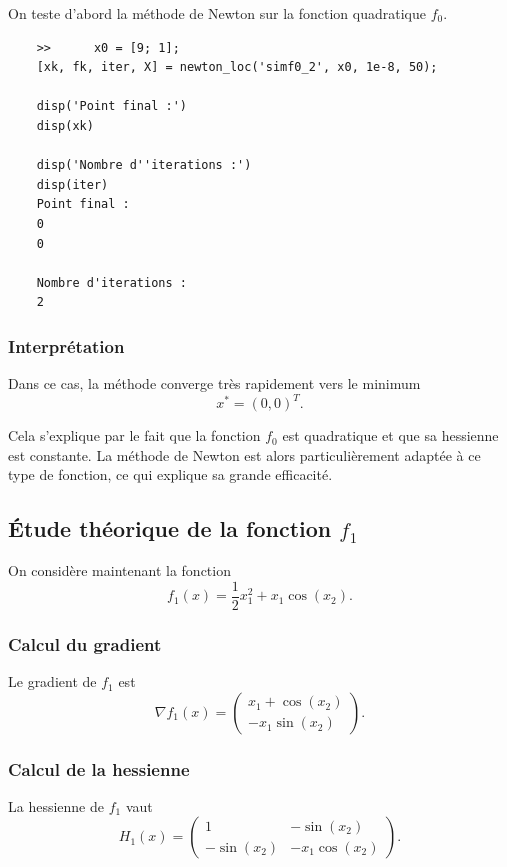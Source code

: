\documentclass[a4paper,12pt]{article}
\begin{document}
	On teste d’abord la méthode de Newton sur la fonction quadratique \(f_0\).
	
	\begin{verbatim}
	>> 		x0 = [9; 1];
	[xk, fk, iter, X] = newton_loc('simf0_2', x0, 1e-8, 50);
	
	disp('Point final :')
	disp(xk)
	
	disp('Nombre d''iterations :')
	disp(iter)
	Point final :
	0
	0
	
	Nombre d'iterations :
	2
	\end{verbatim}
	
	\subsubsection{Interprétation}
	
	Dans ce cas, la méthode converge très rapidement vers le minimum
	\[
	x^*=(0,0)^T.
	\]
	
	Cela s’explique par le fait que la fonction \(f_0\) est quadratique et que sa hessienne est constante. La méthode de Newton est alors particulièrement adaptée à ce type de fonction, ce qui explique sa grande efficacité.
	
	\subsection{Étude théorique de la fonction \(f_1\)}
	
	On considère maintenant la fonction
	\[
	f_1(x)=\frac12 x_1^2+x_1\cos(x_2).
	\]
	
	\subsubsection{Calcul du gradient}
	
	Le gradient de \(f_1\) est
	\[
	\nabla f_1(x)=
	\begin{pmatrix}
	x_1+\cos(x_2)\\
	-x_1\sin(x_2)
	\end{pmatrix}.
	\]
	
	\subsubsection{Calcul de la hessienne}
	
	La hessienne de \(f_1\) vaut
	\[
	H_1(x)=
	\begin{pmatrix}
	1 & -\sin(x_2)\\
	-\sin(x_2) & -x_1\cos(x_2)
	\end{pmatrix}.
	\]
	
\end{document}
